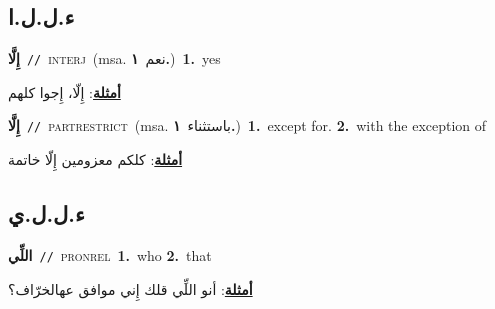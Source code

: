 \documentclass[10pt,a4paper,twoside]{article} %
\begin{document}
\begin{multicols}{2}
\vspace{-3mm}
\subsection*{\color{blue}\foreignlanguage{arabic}{ء.ل.ل.ا}\color{blue}{ (ntws)}} 

{\setlength\topsep{0pt}\textbf{\foreignlanguage{arabic}{إِلَّا}}\ {\color{gray}\texttt{//}\color{black}}\ \textsc{interj}\ \color{gray}(msa. \foreignlanguage{arabic}{نعم}~\foreignlanguage{arabic}{\textbf{١.}})\color{black}\ \textbf{1.}~yes\  \begin{flushright}\color{gray}\foreignlanguage{arabic}{\textbf{\underline{\foreignlanguage{arabic}{أمثلة}}}: إِلّا، إِجوا كلهم}\end{flushright}\color{black}} \vspace{2mm}

{\setlength\topsep{0pt}\textbf{\foreignlanguage{arabic}{إِلَّا}}\ {\color{gray}\texttt{//}\color{black}}\ \textsc{part\textunderscore restrict}\ \color{gray}(msa. \foreignlanguage{arabic}{باستثناء}~\foreignlanguage{arabic}{\textbf{١.}})\color{black}\ \textbf{1.}~except for.  \textbf{2.}~with the exception of\  \begin{flushright}\color{gray}\foreignlanguage{arabic}{\textbf{\underline{\foreignlanguage{arabic}{أمثلة}}}: كلكم معزومين إِلّا خاتمة}\end{flushright}\color{black}} \vspace{2mm}

\vspace{-3mm}
\subsection*{\color{blue}\foreignlanguage{arabic}{ء.ل.ل.ي}\color{blue}{ (ntws)}} 

{\setlength\topsep{0pt}\textbf{\foreignlanguage{arabic}{اللِّي}}\ {\color{gray}\texttt{//}\color{black}}\ \textsc{pron\textunderscore rel}\ \textbf{1.}~who  \textbf{2.}~that\  \begin{flushright}\color{gray}\foreignlanguage{arabic}{\textbf{\underline{\foreignlanguage{arabic}{أمثلة}}}: أنو اللِّي قلك إِني موافق عهالخرّاف؟}\end{flushright}\color{black}} \vspace{2mm}


\end{multicols}
\end{document}
